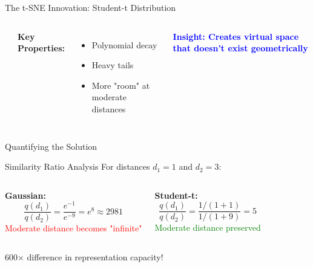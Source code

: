\documentclass[aspectratio=169]{beamer}
\newcommand{\conceptbox}[2]{\colorbox{#1!20}{\textcolor{#1}{\textbf{#2}}}}
\newcommand{\insight}[1]{\conceptbox{blue}{Insight: #1}}
\begin{document}
\begin{frame}{The t-SNE Innovation: Student-t Distribution}
\begin{columns}
\begin{center}
\end{center}

\textbf{Key Properties:}
\begin{itemize}
\item Polynomial decay
\item Heavy tails
\item More "room" at moderate distances
\end{itemize}

\vspace{0.5cm}
\insight{Creates virtual space that doesn't exist geometrically}
\end{columns}
\end{frame}

\begin{frame}{Quantifying the Solution}
\begin{block}{Similarity Ratio Analysis}
For distances $d_1 = 1$ and $d_2 = 3$:
\end{block}

\begin{columns}
\textbf{Gaussian:}
$$\frac{q(d_1)}{q(d_2)} = \frac{e^{-1}}{e^{-9}} = e^8 \approx 2981$$
\textcolor{red}{Moderate distance becomes "infinite"}

\textbf{Student-t:}
$$\frac{q(d_1)}{q(d_2)} = \frac{1/(1+1)}{1/(1+9)} = 5$$
\textcolor{green}{Moderate distance preserved}
\end{columns}

\vspace{0.5cm}
\begin{center}
\colorbox{yellow!30}{\Large 600× difference in representation capacity!}
\end{center}
\end{frame}
\end{document}
